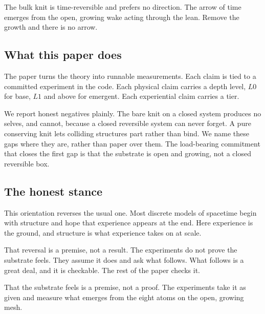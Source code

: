 \begin{result}
The bulk knit is time-reversible and prefers no direction. The arrow of time emerges from the open, growing wake acting through the lean. Remove the growth and there is no arrow.
\end{result}

\subsection{What this paper does}

The paper turns the theory into runnable measurements. Each claim is tied to a committed experiment in the code. Each physical claim carries a depth level, $L0$ for base, $L1$ and above for emergent. Each experiential claim carries a tier.

We report honest negatives plainly. The bare knit on a closed system produces no selves, and cannot, because a closed reversible system can never forget. A pure conserving knit lets colliding structures part rather than bind. We name these gaps where they are, rather than paper over them. The load-bearing commitment that closes the first gap is that the substrate is open and growing, not a closed reversible box.

\subsection{The honest stance}

This orientation reverses the usual one. Most discrete models of spacetime begin with structure and hope that experience appears at the end. Here experience is the ground, and structure is what experience takes on at scale.

That reversal is a premise, not a result. The experiments do not prove the substrate feels. They assume it does and ask what follows. What follows is a great deal, and it is checkable. The rest of the paper checks it.

\begin{result}
That the substrate feels is a premise, not a proof. The experiments take it as given and measure what emerges from the eight atoms on the open, growing mesh.
\end{result}
